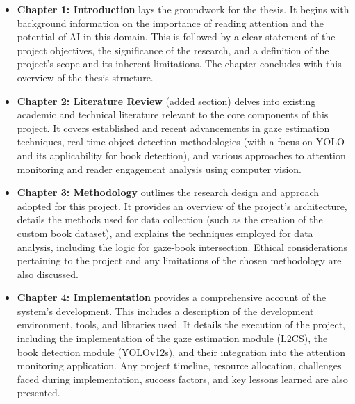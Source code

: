 \begin{itemize}
    \item \textbf{Chapter 1: Introduction} lays the groundwork for the thesis. It begins with background information on the importance of reading attention and the potential of AI in this domain. This is followed by a clear statement of the project objectives, the significance of the research, and a definition of the project's scope and its inherent limitations. The chapter concludes with this overview of the thesis structure.

    \item \textbf{Chapter 2: Literature Review} (added section) delves into existing academic and technical literature relevant to the core components of this project. It covers established and recent advancements in gaze estimation techniques, real-time object detection methodologies (with a focus on YOLO and its applicability for book detection), and various approaches to attention monitoring and reader engagement analysis using computer vision.


    \item \textbf{Chapter 3: Methodology} outlines the research design and approach adopted for this project. It provides an overview of the project's architecture, details the methods used for data collection (such as the creation of the custom book dataset), and explains the techniques employed for data analysis, including the logic for gaze-book intersection. Ethical considerations pertaining to the project and any limitations of the chosen methodology are also discussed.

    \item \textbf{Chapter 4: Implementation} provides a comprehensive account of the system's development. This includes a description of the development environment, tools, and libraries used. It details the execution of the project, including the implementation of the gaze estimation module (L2CS), the book detection module (YOLOv12s), and their integration into the attention monitoring application. Any project timeline, resource allocation, challenges faced during implementation, success factors, and key lessons learned are also presented.


\end{itemize}
